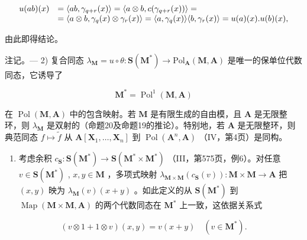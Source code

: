 \[
\begin{array}{r l} u (a b) (x) & = \langle a b, \gamma_ {q + r} (x) \rangle = \langle a \otimes b, c (\gamma_ {q + r} (x)) \rangle = \\ & = \langle a \otimes b, \gamma_ {q} (x) \otimes \gamma_ {r} (x) \rangle = \langle a, \gamma_ {q} (x) \rangle \langle b, \gamma_ {r} (x) \rangle = u (a) (x). u (b) (x), \end{array}
\]

由此即得结论。

注记。--- 2) 复合同态 \(\lambda_{\mathbf{M}}=u\circ\theta:\mathbf{S}(\mathbf{M}^{*})\to\mathrm{Pol}_{\mathbf{A}}(\mathbf{M},\mathbf{A})\) 是唯一的保单位代数同态，它诱导了

\[
\mathbf {M} ^ {*} = \operatorname{Pol} ^ {1} (\mathbf {M}, \mathbf {A})
\]

在 \(\operatorname{Pol}(\mathbf{M}, \mathbf{A})\) 中的包含映射。若 \(\mathbf{M}\) 是有限生成的自由模，且 \(\mathbf{A}\) 是无限整环，则 \(\lambda_{\mathbf{M}}\) 是双射的（命题20及命题19的推论）。特别地，若 \(\mathbf{A}\) 是无限整环，则典范同态 \(f \mapsto \tilde{f}\) 从 \(\mathbf{A}[\mathbf{X}_1, \ldots, \mathbf{X}_n]\) 到 \(\operatorname{Pol}(\mathbf{A}^n, \mathbf{A})\) （IV，第4页）是同构。

\begin{enumerate}
\def\labelenumi{\arabic{enumi})}
\setcounter{enumi}{2}
\tightlist
\item
  考虑余积 \(c_{\mathbf{S}}: \mathbf{S}(\mathbf{M}^{*}) \to \mathbf{S}(\mathbf{M}^{*} \times \mathbf{M}^{*})\) （III，第575页，例6）。对任意 \(v \in \mathbf{S}(\mathbf{M}^{*})\) , \(x, y \in \mathbf{M}\) ，多项式映射 \(\lambda_{\mathbf{M} \times \mathbf{M}}(c_{\mathbf{S}}(v)): \mathbf{M} \times \mathbf{M} \to \mathbf{A}\) 把 \((x, y)\) 映为 \(\lambda_{\mathbf{M}}(v)(x + y)\) 。如此定义的从 \(\mathbf{S}(\mathbf{M}^{*})\) 到 \(\operatorname{Map}(\mathbf{M} \times \mathbf{M}, \mathbf{A})\) 的两个代数同态在 \(\mathbf{M}^{*}\) 上一致，这依据关系式
\end{enumerate}

\[
(v \otimes 1 + 1 \otimes v) (x, y) = v (x + y) \quad (v \in \mathbf {M} ^ {*}).
\]

